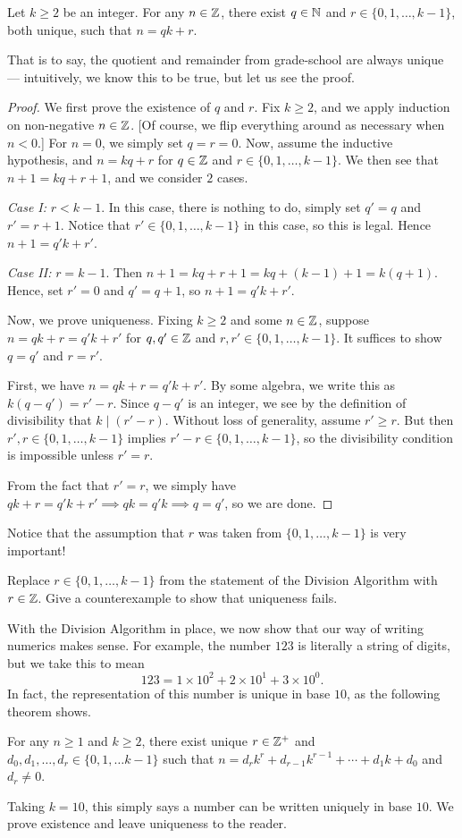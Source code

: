 \documentclass{article}
\begin{document}
\begin{theorem}
Let $k\geq 2$ be an integer. For any $n\in\mathbb Z$, there exist $q\in\mathbb N$ and $r\in\{0, 1, \ldots, k-1\}$, both unique, such that $n = qk + r$.
\end{theorem}
That is to say, the quotient and remainder from grade-school are always unique --- intuitively, we know this to be true, but let us see the proof.
\begin{proof}
We first prove the existence of $q$ and $r$. Fix $k\geq 2$, and we apply induction on non-negative $n\in\mathbb Z$. [Of course, we flip everything around as necessary when $n<0$.] For $n=0$, we simply set $q=r=0$. Now, assume the inductive hypothesis, and $n = kq+r$ for $q\in\mathbb Z$ and $r\in\{0, 1, \ldots, k-1\}$. We then see that $n+1 = kq + r+1$, and we consider $2$ cases.

\textit{Case I:} $r < k-1$. In this case, there is nothing to do, simply set $q' = q$ and $r' = r+1$. Notice that $r' \in \{0, 1, \ldots, k-1\}$ in this case, so this is legal. Hence $n+1 = q'k + r'$.

\textit{Case II:} $r = k-1$. Then $n+1 = kq + r+1 = kq + (k-1)+1 = k(q+1)$. Hence, set $r'=0$ and $q' = q+1$, so $n+1 = q'k + r'$.

Now, we prove uniqueness. Fixing $k\geq 2$ and some $n\in\mathbb Z$, suppose $n = qk+r = q'k+r'$ for $q, q'\in \mathbb Z$ and $r, r' \in \{0, 1, \ldots, k-1\}$. It suffices to show $q=q'$ and $r=r'$. 

First, we have $n = qk+r = q'k + r'$. By some algebra, we write this as $k(q - q') = r'-r$. Since $q-q'$ is an integer, we see by the definition of divisibility that $k\mid (r'-r)$. Without loss of generality, assume $r'\geq r$. But then $r',r \in \{0, 1, \ldots, k-1\}$ implies $r'-r \in \{0, 1, \ldots, k-1\}$, so the divisibility condition is impossible unless $r' = r$.

From the fact that $r'=r$, we simply have $qk + r = q'k + r' \implies qk = q'k \implies q=q'$, so we are done.
\end{proof}
Notice that the assumption that $r$ was taken from $\{0, 1, \ldots, k-1\}$ is very important!
\begin{exercise}
Replace $r\in\{0,1, \ldots, k-1\}$ from the statement of the Division Algorithm with $r\in\mathbb Z$. Give a counterexample to show that uniqueness fails.
\end{exercise}
With the Division Algorithm in place, we now show that our way of writing numerics makes sense. For example, the number $123$ is literally a string of digits, but we take this to mean
$$123 = 1 \times 10^2 + 2\times 10^1 + 3\times 10^0.$$
In fact, the representation of this number is unique in base $10$, as the following theorem shows.
\begin{theorem}\label{base d expansion}
For any $n\geq 1$ and $k\geq 2$, there exist unique $r\in\mathbb Z^+$ and $d_0, d_1, \ldots, d_r \in\{0, 1, \ldots k-1\}$ such that $n = d_rk^r + d_{r-1}k^{r-1} + \cdots +d_1k + d_0$ and $d_r \neq 0$.
\end{theorem}
Taking $k=10$, this simply says a number can be written uniquely in base $10$. We prove existence and leave uniqueness to the reader. \newpage
\end{document}
